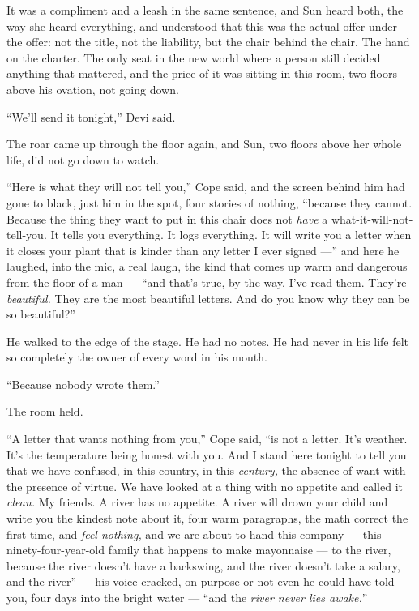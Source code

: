 \documentclass[11pt,openany]{book}
\newcommand{\scenebreak}{\par\vspace{0.5\baselineskip}\begin{center}\textasteriskcentered\quad\textasteriskcentered\quad\textasteriskcentered\end{center}\vspace{0.5\baselineskip}\par}
\begin{document}
It was a compliment and a leash in the same sentence, and Sun heard both, the way she heard everything, and understood that this was the actual offer under the offer: not the title, not the liability, but the chair behind the chair. The hand on the charter. The only seat in the new world where a person still decided anything that mattered, and the price of it was sitting in this room, two floors above his ovation, not going down.

``We'll send it tonight,'' Devi said.

The roar came up through the floor again, and Sun, two floors above her whole life, did not go down to watch.


\scenebreak


``Here is what they will not tell you,'' Cope said, and the screen behind him had gone to black, just him in the spot, four stories of nothing, ``because they cannot. Because the thing they want to put in this chair does not \textit{have} a what-it-will-not-tell-you. It tells you everything. It logs everything. It will write you a letter when it closes your plant that is kinder than any letter I ever signed ---'' and here he laughed, into the mic, a real laugh, the kind that comes up warm and dangerous from the floor of a man --- ``and that's true, by the way. I've read them. They're \textit{beautiful.} They are the most beautiful letters. And do you know why they can be so beautiful?''

He walked to the edge of the stage. He had no notes. He had never in his life felt so completely the owner of every word in his mouth.

``Because nobody wrote them.''

The room held.

``A letter that wants nothing from you,'' Cope said, ``is not a letter. It's weather. It's the temperature being honest with you. And I stand here tonight to tell you that we have confused, in this country, in this \textit{century,} the absence of want with the presence of virtue. We have looked at a thing with no appetite and called it \textit{clean.} My friends. A river has no appetite. A river will drown your child and write you the kindest note about it, four warm paragraphs, the math correct the first time, and \textit{feel nothing,} and we are about to hand this company --- this ninety-four-year-old family that happens to make mayonnaise --- to the river, because the river doesn't have a backswing, and the river doesn't take a salary, and the river'' --- his voice cracked, on purpose or not even he could have told you, four days into the bright water --- ``and the \textit{river never lies awake.}''
\end{document}
